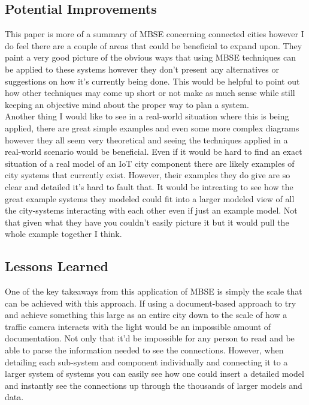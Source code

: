 \documentclass[11pt]{asme2ej}
\begin{document}
\subsection{Potential Improvements}

This paper is more of a summary of MBSE concerning connected cities however I do feel there are a couple of areas that could be beneficial to expand upon. 
They paint a very good picture of the obvious ways that using MBSE techniques can be applied to these systems however they don't present any alternatives or suggestions on how it's currently being done. 
This would be helpful to point out how other techniques may come up short or not make as much sense while still keeping an objective mind about the proper way to plan a system.\\

Another thing I would like to see in a real-world situation where this is being applied, there are great simple examples and even some more complex diagrams however they all seem very theoretical and seeing the techniques applied in a real-world scenario would be beneficial.
Even if it would be hard to find an exact situation of a real model of an IoT city component there are likely examples of city systems that currently exist. However, their examples they do give are so clear and detailed it's hard to fault that.
It would be intreating to see how the great example systems they modeled could fit into a larger modeled view of all the city-systems interacting with each other even if just an example model.
Not that given what they have you couldn't easily picture it but it would pull the whole example together I think.

\subsection{Lessons Learned}

One of the key takeaways from this application of MBSE is simply the scale that can be achieved with this approach. 
If using a document-based approach to try and achieve something this large as an entire city down to the scale of how a traffic camera interacts with the light would be an impossible amount of documentation.
Not only that it'd be impossible for any person to read and be able to parse the information needed to see the connections.
However, when detailing each sub-system and component individually and connecting it to a larger system of systems you can easily see how one could insert a detailed model and instantly see the connections up through the thousands of larger models and data.\\
\end{document}
